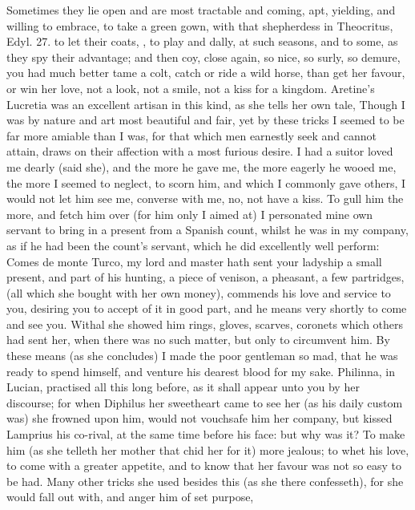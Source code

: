 Sometimes they lie open and are most tractable and coming, apt,
yielding, and willing to embrace, to take a green gown, with that
shepherdess in Theocritus, Edyl. 27. to let their coats, \etc{}, to play
and dally, at such seasons, and to some, as they spy their advantage;
and then coy, close again, so nice, so surly, so demure, you had much
better tame a colt, catch or ride a wild horse, than get her favour, or
win her love, not a look, not a smile, not a kiss for a kingdom.
Aretine's Lucretia was an excellent artisan in this kind, as she
tells her own tale, Though I was by nature and art most beautiful and
fair, yet by these tricks I seemed to be far more amiable than I was,
for that which men earnestly seek and cannot attain, draws on their
affection with a most furious desire. I had a suitor loved me dearly
(said she), and the more he gave me, the more eagerly he wooed
me, the more I seemed to neglect, to scorn him, and which I commonly
gave others, I would not let him see me, converse with me, no, not have
a kiss. To gull him the more, and fetch him over (for him only I aimed
at) I personated mine own servant to bring in a present from a Spanish
count, whilst he was in my company, as if he had been the count's
servant, which he did excellently well perform: Comes de monte
Turco, my lord and master hath sent your ladyship a small present, and
part of his hunting, a piece of venison, a pheasant, a few partridges,
 \etc{} (all which she bought with her own money), commends his love and
service to you, desiring you to accept of it in good part, and he means
very shortly to come and see you. Withal she showed him rings, gloves,
scarves, coronets which others had sent her, when there was no such
matter, but only to circumvent him. By these means (as she
concludes) I made the poor gentleman so mad, that he was ready to spend
himself, and venture his dearest blood for my sake. Philinna, in
Lucian, practised all this long before, as it shall appear unto
you by her discourse; for when Diphilus her sweetheart came to see her
(as his daily custom was) she frowned upon him, would not vouchsafe him
her company, but kissed Lamprius his co-rival, at the same time
before his face: but why was it? To make him (as she telleth her
mother that chid her for it) more jealous; to whet his love, to come
with a greater appetite, and to know that her favour was not so easy to
be had. Many other tricks she used besides this (as she there
confesseth), for she would fall out with, and anger him of set purpose,
